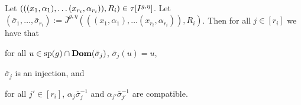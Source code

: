 \documentclass[../main/thesis.tex]{subfiles}
\begin{document}
\begin{lem}
  Let $(((x_1, \alpha_1), \ldots (x_{r_i}, \alpha_{r_i})), R_i) \in
  \tau[I^{g, \eta}]$. Let $(\bar{\sigma}_1, \ldots, \bar{\sigma}_{r_i})
  := \bar{J}^{g, \eta}(((x_1, \alpha_1), \ldots (x_{r_i}, \alpha_{r_i})), R_i)$.
  Then for all $j \in [r_i]$ we have that
  \begin{myenum}
  \item for all $u \in \text{sp}(g) \cap \text{\textbf{Dom}} (\bar{\sigma}_j)$, $\bar{\sigma}_j
    (u) = u$,
  \item $\bar{\sigma}_j$ is an injection, and
  \item for all $j' \in [r_i]$, $\alpha_j \bar{\sigma}^{-1}_j$ and $\alpha_{j'}
    \bar{\sigma}^{-1}_{j'}$ are compatible.
  \end{myenum}
  \label{lem:bar-J-construction}
\end{lem}
\end{document}
